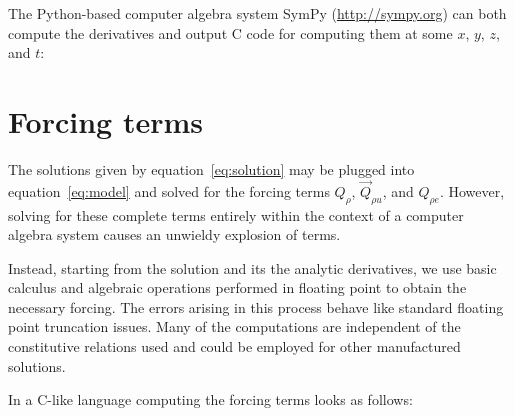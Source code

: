 \documentclass[10pt,reqno]{amsart}
\begin{document}
The Python-based computer algebra system SymPy (\url{http://sympy.org})
can both compute the derivatives and output C code for computing them
at some $x$, $y$, $z$, and $t$:


\section{Forcing terms}

The solutions given by equation~\eqref{eq:solution} may be plugged into
equation~\eqref{eq:model} and solved for the forcing terms $Q_{\rho}$,
$\vec{Q}_{\rho{}u}$, and $Q_{\rho{}e}$.  However, solving for these complete
terms entirely within the context of a computer algebra system causes an
unwieldy explosion of terms.

Instead, starting from the solution and its the analytic derivatives, we use
basic calculus and algebraic operations performed in floating point to obtain
the necessary forcing.  The errors arising in this process behave like standard
floating point truncation issues.  Many of the computations are independent of
the constitutive relations used and could be employed for other manufactured
solutions.

In a C-like language computing the forcing terms looks as follows:

\end{document}

